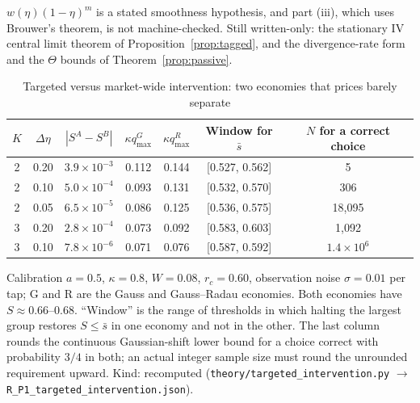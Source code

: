 \documentclass[12pt]{article}
\theoremstyle{definition}
\theoremstyle{remark}
\begin{document}
$w(\eta)(1-\eta)^m$ is a stated smoothness hypothesis, and part (iii), which uses Brouwer's theorem, is not machine-checked. Still written-only: the stationary IV central limit theorem of Proposition~\ref{prop:tagged}, and the divergence-rate form and the $\Theta$ bounds of Theorem~\ref{prop:passive}.

\begin{table}[!htbp]\centering\footnotesize
\begin{threeparttable}
\caption{Targeted versus market-wide intervention: two economies that prices barely separate}\label{tab:target}
\setlength{\tabcolsep}{3pt}
\begin{tabular}{ccccccc}
\toprule
$K$ & $\Delta\eta$ & $|S^A-S^B|$ & $\kappa q^{G}_{\max}$ & $\kappa q^{R}_{\max}$ & Window for $\bar s$ & $N$ for a correct choice\\
\midrule
2 & 0.20 & $3.9\times10^{-3}$ & 0.112 & 0.144 & [0.527, 0.562] & 5\\
2 & 0.10 & $5.0\times10^{-4}$ & 0.093 & 0.131 & [0.532, 0.570] & 306\\
2 & 0.05 & $6.5\times10^{-5}$ & 0.086 & 0.125 & [0.536, 0.575] & 18{,}095\\
3 & 0.20 & $2.8\times10^{-4}$ & 0.073 & 0.092 & [0.583, 0.603] & 1{,}092\\
3 & 0.10 & $7.8\times10^{-6}$ & 0.071 & 0.076 & [0.587, 0.592] & $1.4\times10^{6}$\\
\bottomrule
\end{tabular}
\begin{tablenotes}\footnotesize\item Calibration $a=0.5$, $\kappa=0.8$, $W=0.08$, $r_c=0.60$, observation noise $\sigma=0.01$ per tap; G and R are the Gauss and Gauss--Radau economies. Both economies have $S\approx0.66$--$0.68$. ``Window'' is the range of thresholds in which halting the largest group restores $S\le\bar s$ in one economy and not in the other. The last column rounds the continuous Gaussian-shift lower bound for a choice correct with probability $3/4$ in both; an actual integer sample size must round the unrounded requirement upward. Kind: recomputed (\texttt{theory/targeted\_intervention.py} $\to$ \nolinkurl{R_P1_targeted_intervention.json}).\end{tablenotes}
\end{threeparttable}
\end{table}
\end{document}
